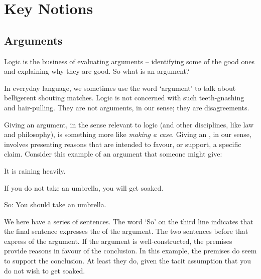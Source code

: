 

\part{Key Notions}
\label{ch.intro}


\chapter{Arguments}\label{argRaining}\label{s:Arguments}
Logic is the business of evaluating arguments – identifying some of the good ones and explaining why they are good. So what is an argument?

In everyday language, we sometimes use the word `argument' to talk about belligerent shouting matches. Logic is not concerned with such teeth-gnashing and hair-pulling. They are not arguments, in our sense; they are disagreements. 

Giving an argument, in the sense relevant to logic (and other disciplines, like law and philosophy), is something more like \emph{making a case}. Giving an , in our sense, involves presenting reasons that are intended to favour, or support, a specific claim. Consider this example of an argument that someone might give:
	\begin{earg}
		\item[] It is raining heavily.
		\item[] If you do not take an umbrella, you will get soaked.
		\item[So:] You should take an umbrella.
	\end{earg}
We here have a series of sentences. The word `So' on the third line indicates that the final sentence expresses the  of the argument. The two sentences before that express  of the argument. If the argument is well-constructed, the premises provide reasons in favour of the conclusion. In this example, the premises do seem to support the conclusion. At least they do, given the tacit assumption that you do not wish to get soaked.

